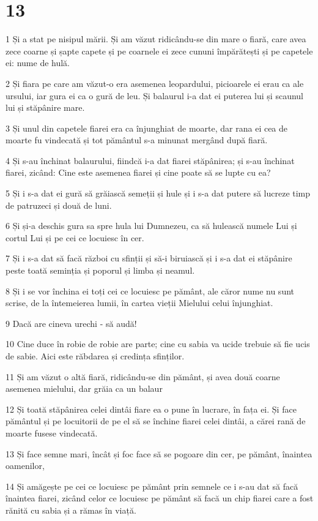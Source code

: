 \chapter{13}

\par 1 Și a stat pe nisipul mării. Și am văzut ridicându-se din mare o fiară, care avea zece coarne și șapte capete și pe coarnele ei zece cununi împărătești și pe capetele ei: nume de hulă.
\par 2 Și fiara pe care am văzut-o era asemenea leopardului, picioarele ei erau ca ale ursului, iar gura ei ca o gură de leu. Și balaurul i-a dat ei puterea lui și scaunul lui și stăpânire mare.
\par 3 Și unul din capetele fiarei era ca înjunghiat de moarte, dar rana ei cea de moarte fu vindecată și tot pământul s-a minunat mergând după fiară.
\par 4 Și s-au închinat balaurului, fiindcă i-a dat fiarei stăpânirea; și s-au închinat fiarei, zicând: Cine este asemenea fiarei și cine poate să se lupte cu ea?
\par 5 Și i s-a dat ei gură să grăiască semeții și hule și i s-a dat putere să lucreze timp de patruzeci și două de luni.
\par 6 Și și-a deschis gura sa spre hula lui Dumnezeu, ca să hulească numele Lui și cortul Lui și pe cei ce locuiesc în cer.
\par 7 Și i s-a dat să facă război cu sfinții și să-i biruiască și i s-a dat ei stăpânire peste toată seminția și poporul și limba și neamul.
\par 8 Și i se vor închina ei toți cei ce locuiesc pe pământ, ale căror nume nu sunt scrise, de la întemeierea lumii, în cartea vieții Mielului celui înjunghiat.
\par 9 Dacă are cineva urechi - să audă!
\par 10 Cine duce în robie de robie are parte; cine cu sabia va ucide trebuie să fie ucis de sabie. Aici este răbdarea și credința sfinților.
\par 11 Și am văzut o altă fiară, ridicându-se din pământ, și avea două coarne asemenea mielului, dar grăia ca un balaur
\par 12 Și toată stăpânirea celei dintâi fiare ea o pune în lucrare, în fața ei. Și face pământul și pe locuitorii de pe el să se închine fiarei celei dintâi, a cărei rană de moarte fusese vindecată.
\par 13 Și face semne mari, încât și foc face să se pogoare din cer, pe pământ, înaintea oamenilor,
\par 14 Și amăgește pe cei ce locuiesc pe pământ prin semnele ce i s-au dat să facă înaintea fiarei, zicând celor ce locuiesc pe pământ să facă un chip fiarei care a fost rănită cu sabia și a rămas în viață.
